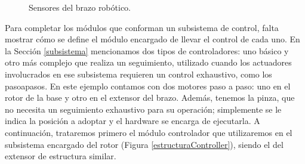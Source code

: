 \begin{figure}[h]
\caption{Sensores del brazo robótico.}
\label{sensores}
\begin{center}
\end{center}
\end{figure}

Para completar los módulos que conforman un subsistema de control, falta mostrar cómo se define el módulo encargado de llevar el control de cada uno. En la Sección \ref{subsistema} mencionamos dos tipos de controladores: uno básico y otro más complejo que realiza un seguimiento, utilizado cuando los actuadores involucrados en ese subsistema requieren un control exhaustivo, como los \glspl{pasoapaso}. En este ejemplo contamos con dos motores paso a paso: uno en el rotor de la base y otro en el extensor del brazo. Además, tenemos la pinza, que no necesita un seguimiento exhaustivo para su operación; simplemente se le indica la posición a adoptar y el hardware se encarga de ejecutarla. A continuación, trataremos primero el módulo controlador que utilizaremos en el subsistema encargado del rotor \RotorCtrl (Figura \ref{estructuraController}), siendo el del extensor de estructura similar.

